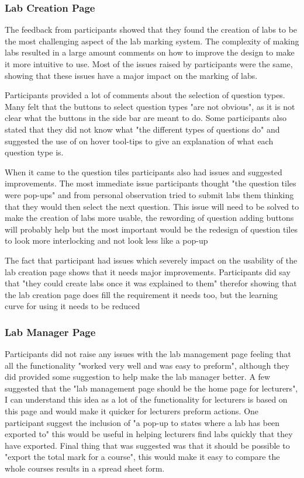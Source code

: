 \documentclass[12pt]{article}  %
\begin{document}
\subsubsection*{Lab Creation Page}

The feedback from participants showed that they found the creation of labs to be the most challenging aspect of the lab marking system. The complexity of making labs resulted in a large amount comments on how to improve the design to make it more intuitive to use. Most of the issues raised by participants were the same, showing that these issues have a major impact on the marking of labs. 

Participants provided a lot of comments about the selection of question types. Many felt that the buttons to select question types "are not obvious", as it is not clear what the buttons in the side bar are meant to do. Some participants also stated that they did not know what "the different types of questions do" and suggested the use of on hover tool-tips to give an explanation of what each question type is.

When it came to the question tiles participants also had issues and suggested improvements. The most immediate issue participants thought "the question tiles were pop-ups" and from personal observation tried to submit labs them thinking that they would then select the next question. This issue will need to be solved to make the creation of labs more usable, the rewording of question adding buttons will probably help but the most important would be the redesign of question tiles to look more interlocking and not look less like a pop-up

The fact that participant had issues which severely  impact on the usability of the lab creation page shows that it needs major improvements. Participants did say that "they could create labs once it was explained to them" therefor showing that the lab creation page does fill the requirement it needs too, but the learning curve for using it needs to be reduced



\subsubsection*{Lab Manager Page}

Participants did not raise any issues with the lab management page feeling that all the functionality "worked very well and was easy to preform", although they did provided some suggestion to help make the lab manager better. A few suggested that the "lab management page should be the home page for lecturers", I can understand this idea as a lot of the functionality for lecturers is based on this page and would make it quicker for lecturers preform actions. One participant suggest the inclusion of "a pop-up to states where a lab has been exported to" this would be useful in helping lecturers find labs quickly that they have exported. Final thing that was suggested was that it should be possible to "export the total mark for a course", this would make it easy to compare the whole courses results in a spread sheet form.
\end{document}
